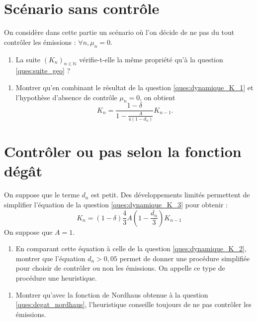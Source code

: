\documentclass[12pt]{article}
\newcommand{\ques}[1]{\begin{enumerate}[resume]
\item  #1
\end{enumerate}}
\newcommand{\rep}[1]{\textit{Réponse :} #1 \\}
\renewcommand{\rep}[1]{ }
\theoremstyle{remark}
\def\NN{\mathbb{N}}
\begin{document}
\section{Scénario sans contrôle}
On considère dans cette partie un scénario où l'on décide de ne pas du tout contrôler les émissions : $\forall n, \mu_n=0$.
\ques{La suite $(K_n)_{n\in \NN}$ vérifie-t-elle la même propriété qu'à la question \ref{ques:suite_geo} ?}
\rep{Non, dans ce cas la suite $(T_n)_{n\in \NN}$, et donc la suite $(\Omega_n)_{n\in \NN}$, n'est pas constante et dépend de $(K_n)_{n\in \NN}$. La suite $(K_n)_{n\in \NN}$ n'est donc pas géométrique.}


\ques{Montrer qu'en combinant le résultat de la question \ref{ques:dynamique_K_1} et l'hypothèse d'absence de contrôle $\mu_n =0$, on obtient
\begin{equation*} 
K_n=\frac{1- \delta}{1- \frac{A}{4(1-d_n)}} K_{n-1}.\end{equation*}
\label{ques:dynamique_K_3}
}

\section{Contrôler ou pas selon la fonction dégât}

On suppose que le terme $d_n$ est petit. Des développements limités permettent de simplifier l'équation de la question \ref{ques:dynamique_K_3} pour obtenir :
\begin{equation*} 
K_n=(1- \delta)\frac{4}{3}A(1-\frac{d_n}{3}) K_{n-1}\end{equation*}
On suppose que $A=1$.
\ques{En comparant cette équation à celle de la question \ref{ques:dynamique_K_2}, montrer que l'équation $d_n>0,05$ permet de donner une procédure simplifiée pour choisir de contrôler ou non les émissions.
On appelle ce type de procédure une heuristique.}
\rep{On choisit de contrôler les émissions lorsque le facteur multiplicatif du scénario contrôlé est supérieur au scénario non contrôlé :
\begin{equation*}
(1-\delta)\frac{4}{3}(1-\frac{d_n}{3}) <\frac{1-\delta}{1-0,2373A}
\end{equation*}
\begin{equation*}
1-\frac{d_n}{3} <\frac{3}{4}\times \frac{1}{0,7627}
\end{equation*}
\begin{equation*}
0,05=3-\frac{9}{4 \times 0,7627} < d_n
\end{equation*}
}


\ques{Montrer qu'avec la fonction de Nordhaus obtenue à la question \ref{ques:degat_nordhaus}, l'heuristique conseille toujours de ne pas contrôler les émissions.}
\rep{Lecture graphique ou calculer $3\times \sqrt{0,05/0,0133}=5,8$ °C.}
\end{document}

